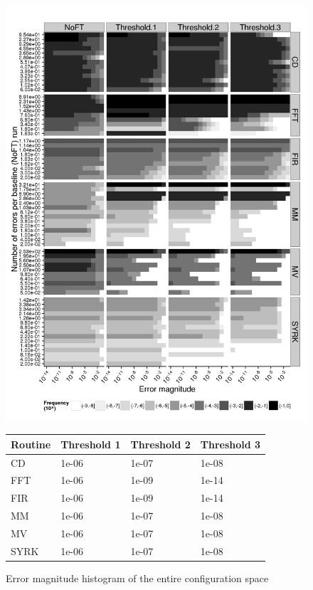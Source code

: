 \documentclass{sig-alternate}
\begin{document}
{\begin{figure}[ht!]
\centering
\includegraphics[width=1.00\columnwidth]{figs/4_1_1_Exp2_2_Heatmap_Error_ConfSpace.png}
\begin{tabular}{|p{0.5in}|p{0.7in}|p{0.7in}|p{0.7in}|}
\hline
Routine & Threshold 1 & Threshold 2 & Threshold 3 \\
\hline
\hline
CD & 1e-06 & 1e-07 & 1e-08 \\
\hline
FFT & 1e-06 & 1e-09 & 1e-14 \\
\hline
FIR & 1e-06 & 1e-09 & 1e-14 \\
\hline
MM & 1e-06 & 1e-07 & 1e-08 \\
\hline
MV & 1e-06 & 1e-07 & 1e-08 \\
\hline
SYRK & 1e-06 & 1e-07 & 1e-08 \\
\hline
\end{tabular}
\caption{Error magnitude histogram of the entire configuration space}
\label{fig:algo_err_heatmap}
\end{figure}

}
\end{document}
